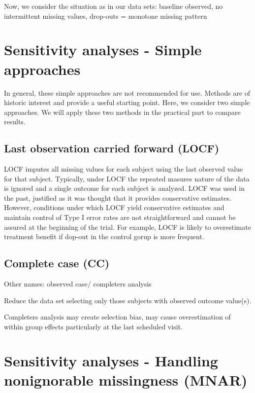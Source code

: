 \documentclass[
  letterpaper,
  DIV=11,
  numbers=noendperiod]{scrreprt}
\begin{document}
Now, we consider the situation as in our data sets: baseline observed,
no intermittent missing values, drop-outs = monotone missing pattern

\hypertarget{sensitivity-analyses---simple-approaches}{%
\section{Sensitivity analyses - Simple
approaches}\label{sensitivity-analyses---simple-approaches}}

In general, these simple approaches are not recommended for use. Methods
are of historic interest and provide a useful starting point. Here, we
consider two simple approaches. We will apply these two methods in the
practical part to compare results.

\hypertarget{last-observation-carried-forward-locf}{%
\subsection{Last observation carried forward
(LOCF)}\label{last-observation-carried-forward-locf}}

LOCF imputes all missing values for each subject using the last observed
value for that subject. Typically, under LOCF the repeated masures
nature of the data is ignored and a single outcome for each subject is
analyzed. LOCF was used in the past, justified as it was thought that it
provides conservative estimates. However, conditions under which LOCF
yield conservative estimates and maintain control of Type I error rates
are not straightforward and cannot be assured at the beginning of the
trial. For example, LOCF is likely to overestimate treatment benefit if
dop-out in the control gorup is more frequent.

\hypertarget{complete-case-cc}{%
\subsection{Complete case (CC)}\label{complete-case-cc}}

Other names: observed case/ completers analysis

Reduce the data set selecting only those subjects with observed outcome
value(s).

Completers analysis may create selection bias, may cause overestimation
of within group effects particularly at the last scheduled visit.

\hypertarget{sensitivity-analyses---handling-nonignorable-missingness-mnar}{%
\section{Sensitivity analyses - Handling nonignorable missingness
(MNAR)}\label{sensitivity-analyses---handling-nonignorable-missingness-mnar}}
\end{document}

